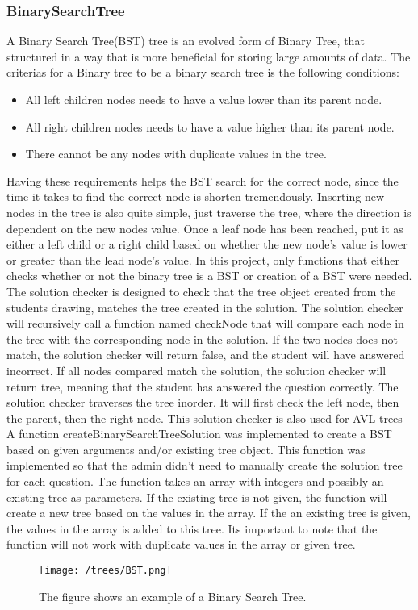 \subsubsection{BinarySearchTree}
A Binary Search Tree(BST) tree is an evolved form of Binary Tree, that structured in a way that is more beneficial for storing large amounts of data. The criterias for a Binary tree to be a binary search tree is the following conditions:
\begin{itemize}
	\item{All left children nodes needs to have a value lower than its parent node.}
	\item{All right children nodes needs to have a value higher than its parent node.}
	\item{There cannot be any nodes with duplicate values in the tree.}
\end{itemize}
Having these requirements helps the BST search for the correct node, since the time it takes to find the correct node is shorten tremendously. Inserting new nodes in the tree is also quite simple, just traverse the tree, where the direction is dependent on the new nodes value. Once a leaf node has been reached, put it as either a left child or a right child based on whether the new node's value is lower or greater than the lead node's value. In this project, only functions that either checks whether or not the binary tree is a BST or creation of a BST were needed. %
\\[11pt]
The solution checker is designed to check that the tree object created from the students drawing, matches the tree created in the solution. The solution checker will recursively call a function named checkNode that will compare each node in the tree with the corresponding node in the solution. If the two nodes does not match, the solution checker will return false, and the student will have answered incorrect. If all nodes compared match the solution, the solution checker will return tree, meaning that the student has answered the question correctly. The solution checker traverses the tree inorder. It will first check the left node, then the parent, then the right node. This solution checker is also used for AVL trees%
\\[11pt]
A function createBinarySearchTreeSolution was implemented to create a BST based on given arguments and/or existing tree object. This function was implemented so that the admin didn't need to manually create the solution tree for each question. The function takes an array with integers and possibly an existing tree as parameters. If the existing tree is not given, the function will create a new tree based on the values in the array. If the an existing tree is given, the values in the array is added to this tree. Its important to note that the function will not work with duplicate values in the array or given tree.

\begin{figure}
	\centering
	\texttt{[image: /trees/BST.png]}
	\caption{The figure shows an example of a Binary Search Tree.}	
	\label{fig:BST}
\end{figure}
